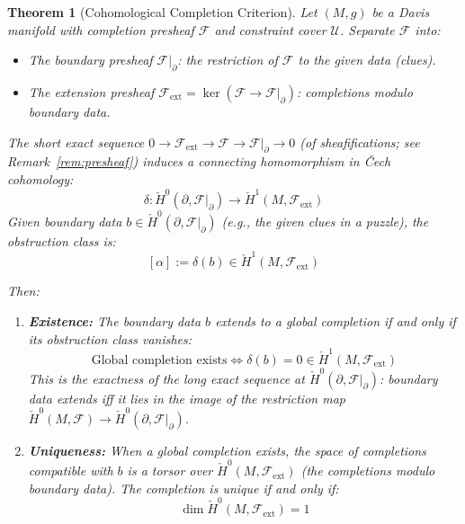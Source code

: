 \documentclass[11pt,letterpaper]{article}
\newtheorem{theorem}[conjecture]{Theorem}
\newcommand{\Hcech}{\check{H}}
\newcommand{\sheaf}{\mathcal{F}}
\newcommand{\cover}{\mathcal{U}}
\begin{document}
\begin{theorem}[Cohomological Completion 
Criterion]\label{conj:obstruction}
Let $(M, g)$ be a Davis manifold with completion presheaf $\sheaf$ and 
constraint cover $\cover$. Separate $\sheaf$ into:
\begin{itemize}
    \item The \emph{boundary presheaf} $\sheaf|_\partial$: the 
    restriction of $\sheaf$ to the given data (clues).
    \item The \emph{extension presheaf} $\sheaf_{\mathrm{ext}} = 
    \ker(\sheaf \to \sheaf|_\partial)$: completions modulo boundary 
    data.
\end{itemize}
The short exact sequence 
$0 \to \sheaf_{\mathrm{ext}} \to \sheaf \to \sheaf|_\partial \to 0$ 
(of sheafifications; see Remark~\ref{rem:presheaf}) induces a 
\emph{connecting homomorphism} in \v{C}ech cohomology:
\begin{equation}\label{eq:connecting_hom}
    \delta : \Hcech^0(\partial, \sheaf|_\partial) \longrightarrow 
    \Hcech^1(M, \sheaf_{\mathrm{ext}})
\end{equation}
Given boundary data $b \in \Hcech^0(\partial, \sheaf|_\partial)$ 
(e.g., the given clues in a puzzle), the \emph{obstruction class} is:
\begin{equation}\label{eq:obstruction_class}
    [\alpha] := \delta(b) \in \Hcech^1(M, \sheaf_{\mathrm{ext}})
\end{equation}

Then:

\begin{enumerate}[label=(\alph*)]
    \item \textbf{Existence:} The boundary data $b$ extends to a 
    global completion if and only if its obstruction class vanishes:
    \begin{equation}\label{eq:existence}
        \text{Global completion exists} \iff 
        \delta(b) = 0 \in \Hcech^1(M, \sheaf_{\mathrm{ext}})
    \end{equation}
    This is the exactness of the long exact sequence at 
    $\Hcech^0(\partial, \sheaf|_\partial)$: boundary data extends iff 
    it lies in the image of the restriction map 
    $\Hcech^0(M, \sheaf) \to \Hcech^0(\partial, \sheaf|_\partial)$.
    
    \item \textbf{Uniqueness:} When a global completion exists, the 
    space of completions compatible with $b$ is a torsor over 
    $\Hcech^0(M, \sheaf_{\mathrm{ext}})$ (the completions modulo 
    boundary data). The completion is unique if and only if:
    \begin{equation}\label{eq:uniqueness}
        \dim \Hcech^0(M, \sheaf_{\mathrm{ext}}) = 1
    \end{equation}
    

\end{enumerate}
\end{theorem}
\end{document}
